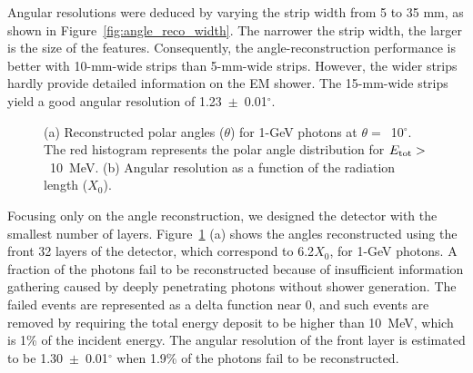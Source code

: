 \documentclass[preprint,12pt,times,a4paper]{elsarticle}
\begin{document}
Angular resolutions were deduced by varying the strip width from 5 to 35 mm, as shown in Figure~\ref{fig:angle_reco_width}. The narrower the strip width, the larger is the size of the features. Consequently, the angle-reconstruction performance is better with 10-mm-wide strips than 5-mm-wide strips. However, the wider strips hardly provide detailed information on the EM shower. The 15-mm-wide strips yield a good angular resolution of 1.23~$\pm$~0.01$^{\circ}$.

\begin{figure}[!hbt]
\centering
{}
\caption{ (a) Reconstructed polar angles ($\theta$) for 1-GeV photons at $\theta=$~10$^{\circ}$. The red histogram represents the polar angle distribution for $E_{\rm{tot}}>$~10~MeV. (b) Angular resolution as a function of the radiation length ($X_{0}$).}
\label{fig:angle_reco_layer}
\end{figure}

Focusing only on the angle reconstruction, we designed the detector with the smallest number of layers. Figure~\ref{fig:angle_reco_layer} (a) shows the angles reconstructed using the front 32 layers of the detector, which correspond to 6.2$X_{0}$, for 1-GeV photons. A fraction of the photons fail to be reconstructed because of insufficient information gathering caused by deeply penetrating photons without shower generation. The failed events are represented as a delta function near 0, and such events are removed by requiring the total energy deposit to be higher than 10~MeV, which is 1\% of the incident energy. The angular resolution of the front layer is estimated to be 1.30~$\pm$~0.01$^{\circ}$ when 1.9\% of the photons fail to be reconstructed.
\end{document}
